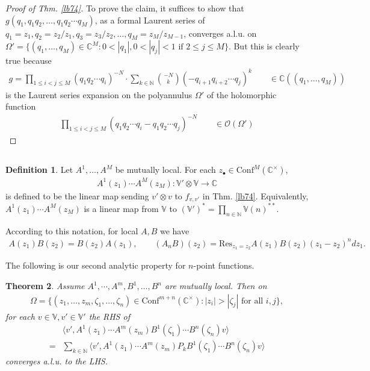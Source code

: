 \documentclass[11pt,b5paper,notitlepage]{article}
\theoremstyle{definition}
\newtheorem{df}{Definition}[section]
\theoremstyle{plain}
\newtheorem{thm}[df]{Theorem}
\newcommand{\Conf}{\mathrm{Conf}}
\newcommand{\Res}{\mathrm{Res}}
\newcommand{\bk}[1]{\langle {#1}\rangle}
\newcommand{\scr}{\mathscr}
\newcommand{\blt}{\bullet}
\newcommand{\Vbb}{\mathbb V}
\newcommand{\Cbb}{\mathbb C}
\newcommand{\Nbb}{\mathbb N}
\numberwithin{equation}{section}
\begin{document}
\begin{proof}[Proof of Thm. \ref{lb74}]
To prove the claim, it suffices to show that $g(q_1,q_1q_2,\dots,q_1q_2\cdots q_M)$, as a formal Laurent series of $q_1=z_1,q_2=z_2/z_1,q_3=z_3/z_2,\dots,q_M=z_M/z_{M-1}$, converges a.l.u. on $\Omega'=\{(q_1,\dots,q_M)\in\Cbb^M:0<|q_1|,0<|q_j|<1\text{ if }2\leq j\leq M\}$. But this is clearly true because
\begin{align*}
g=\prod_{1\leq i<j\leq M}(q_1q_2\cdots q_i)^{-N}\cdot \sum_{k\in\Nbb}{-N\choose k}(-q_{i+1}q_{i+2}\cdots q_j)^k\qquad\in\Cbb((q_1,\dots,q_M))
\end{align*}
is the Laurent series expansion on the polyannulus $\Omega'$ of the holomorphic function
\begin{align*}
\prod_{1\leq i<j\leq M}(q_1q_2\cdots q_i-q_1q_2\cdots q_j)^{-N}\qquad\in\scr O(\Omega')
\end{align*}
\end{proof}




\subsection{}
\begin{df}\label{lb75}
	Let $A^1,\dots,A^M$ be mutually local. For each $z_\blt\in\Conf^M(\Cbb^\times)$,
	\begin{align}
		A^1(z_1)\cdots A^M(z_M):\Vbb'\otimes\Vbb\rightarrow\Cbb	
	\end{align}
is defined to be the linear map sending $v'\otimes v$ to $f_{v,v'}$ in Thm. \ref{lb74}. Equivalently, $A^1(z_1)\cdots A^M(z_M)$ is a linear map from $\Vbb$ to $(\Vbb')^*=\prod_{n\in\Nbb}\Vbb(n)^{**}$.
\end{df}
According to this notation, for local $A,B$ we have
\begin{align}
	A(z_1)B(z_2)=B(z_2)A(z_1),\qquad (A_nB)(z_2)=\Res_{z_1=z_2}A(z_1)B(z_2)(z_1-z_2)^ndz_1.
\end{align}


The following is our second analytic property for $n$-point functions.

\begin{thm}\label{lb77}
Assume $A^1,\cdots,A^m,B^1,\dots,B^n$ are mutually local. Then on
\begin{align*}
\Omega=\{(z_1,\dots,z_m,\zeta_1,\dots,\zeta_n)\in\Conf^{m+n}(\Cbb^\times):|z_i|>|\zeta_j|\text{ for all }i,j\},
\end{align*}
for each $v\in\Vbb,v'\in\Vbb'$ the RHS of
\begin{align}
&\bk{v',A^1(z_1)\cdots A^m(z_m)B^1(\zeta_1)\cdots B^n(\zeta_n)v}\nonumber\\
=&\sum_{k\in\Nbb}	\bk{v',A^1(z_1)\cdots A^m(z_m)P_kB^1(\zeta_1)\cdots B^n(\zeta_n)v}\label{eq122}
\end{align}
converges a.l.u. to the LHS.
\end{thm}
\end{document}
